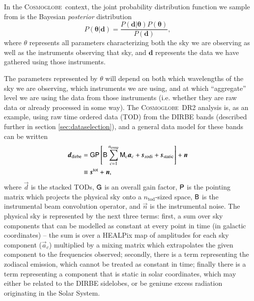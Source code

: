 \documentclass{aa}
\def\Cosmoglobe{\textsc{Cosmoglobe}}
\renewcommand{\P}[0]{\tens{P}}
\newcommand{\G}[0]{\tens{G}}
\newcommand{\B}[0]{\tens{B}}
\renewcommand{\a}[0]{\vec{a}}
\newcommand{\n}[0]{\vec{n}}
\newcommand{\dv}[0]{\vec{d}}
\newcommand{\s}[0]{\vec{s}}
\newcommand{\M}[0]{\tens{M}}
\begin{document}
In the \Cosmoglobe\ context, the joint probability distribution function we
sample from is the Bayesian \emph{posterior} distribution
\begin{equation}
    P(\mathbf{\theta} | \mathbf{d}) =
    \frac{P(\mathbf{d}|\mathbf{\theta})P(\mathbf{\theta})}{P(\mathbf{d})},
\end{equation}
where $\theta$ represents all parameters characterizing both the sky we are
observing as well as the instruments observing that sky, and $\mathbf{d}$
represents the data we have gathered using those instruments.

The parameters represented by $\theta$ will depend on both which wavelengths of
the sky we are observing, which instruments we are using, and at which
``aggregate'' level we are using the data from those instruments (i.e. whether
they are raw data or already processed in some way). The \Cosmoglobe\ DR2
analysis is, as an example, using raw time ordered data (TOD) from the DIRBE
bands (described further in section \ref{sec:dataselection}), and a general
data model for these bands can be written
\begin{align}
	\label{eq:model}
    \dv_{\mathrm{dirbe}} &=\G\P\left[\B\sum_{c=1}^{n_{\mathrm{comp}}}\M_c\a_c+\s_{\mathrm{zodi}} +
          \s_{\mathrm{static}}\right] + \n \\
                         & \equiv \s^{\mathrm{tot}} + \n \nonumber,
\end{align}
where $\dv$ is the stacked TODs, $\G$ is an overall gain factor, $\P$ is the
pointing matrix which projects the physical sky onto a $n_{\mathrm{tod}}$-sized
space, $\B$ is the instrumental beam convolution operator, and $\n$ is the
instrumental noise. The physical sky is represented by the next three terms:
first, a sum over sky components that can be modelled as constant at every
point in time (in galactic coordinates) -- the sum is over a HEALPix map of
amplitudes for each sky component ($\a_c$) multiplied by a mixing matrix which
extrapolates the given component to the frequencies observed; secondly, there
is a term representing the zodiacal emission, which cannot be treated as
constant in time; finally there is a term representing a component that is
static in solar coordinates, which may either be related to the DIRBE
sidelobes, or be geniune excess radiation originating in the Solar System.
\end{document}
